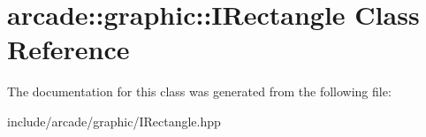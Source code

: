 \hypertarget{classarcade_1_1graphic_1_1_i_rectangle}{}\section{arcade\+::graphic\+::I\+Rectangle Class Reference}
\label{classarcade_1_1graphic_1_1_i_rectangle}


The documentation for this class was generated from the following file\+:\begin{DoxyCompactItemize}
\item 
include/arcade/graphic/I\+Rectangle.\+hpp\end{DoxyCompactItemize}
